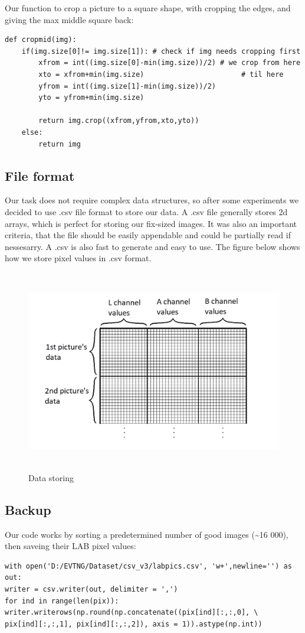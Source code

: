 \documentclass[12pt]{article}
\begin{document}
\noindent Our function to crop a picture to a square shape, with cropping the edges, and giving the max middle square back:
\begin{lstlisting}
def cropmid(img): 
	if(img.size[0]!= img.size[1]): # check if img needs cropping first
		xfrom = int((img.size[0]-min(img.size))/2) # we crop from here
		xto = xfrom+min(img.size)                       # til here
		yfrom = int((img.size[1]-min(img.size))/2)
		yto = yfrom+min(img.size)

		return img.crop((xfrom,yfrom,xto,yto))
	else:
		return img
\end{lstlisting}

\subsection{File format}
Our task does not require complex data structures, so after some experiments we decided to use .csv file format to store our data. A .csv file generally stores 2d arrays, which is perfect for storing our fix-sized images. It was also an important criteria, that the file should be easily appendable and could be partially read if nessesarry. A .csv is also fast to generate and easy to use. The figure below shows how we store pixel values in .csv format.
\begin{figure}[H]
	\centering
	\captionsetup{justification=centering}
	\includegraphics[height=250pt]{data_storing}
	\caption{Data storing}	
	\label{fig:d_s}
\end{figure}
\subsection{Backup}
Our code works by sorting a predetermined number of good images (\textasciitilde 16 000), then saveing their LAB pixel values:
\begin{lstlisting}
with open('D:/EVTNG/Dataset/csv_v3/labpics.csv', 'w+',newline='') as out:
writer = csv.writer(out, delimiter = ',')
for ind in range(len(pix)):
writer.writerows(np.round(np.concatenate((pix[ind][:,:,0], \
pix[ind][:,:,1], pix[ind][:,:,2]), axis = 1)).astype(np.int))
\end{lstlisting}
\end{document}

